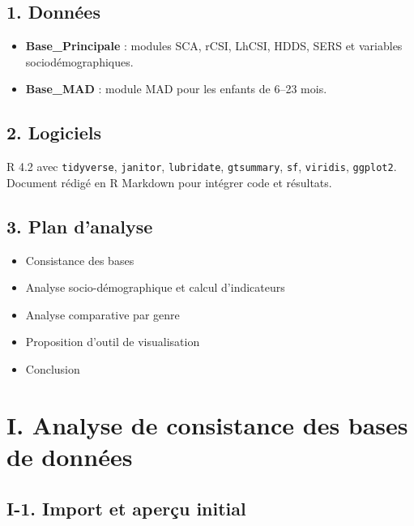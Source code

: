 \documentclass[
]{article}
\providecommand{\tightlist}{%
  \setlength{\itemsep}{0pt}\setlength{\parskip}{0pt}}
\begin{document}
\hypertarget{donnuxe9es}{%
\subsection{1. Données}\label{donnuxe9es}}

\begin{itemize}
\tightlist
\item
  \textbf{Base\_Principale} : modules SCA, rCSI, LhCSI, HDDS, SERS et
  variables sociodémographiques.
\item
  \textbf{Base\_MAD} : module MAD pour les enfants de 6--23 mois.
\end{itemize}

\hypertarget{logiciels}{%
\subsection{2. Logiciels}\label{logiciels}}

R 4.2 avec \texttt{tidyverse}, \texttt{janitor}, \texttt{lubridate},
\texttt{gtsummary}, \texttt{sf}, \texttt{viridis}, \texttt{ggplot2}.
Document rédigé en R Markdown pour intégrer code et résultats.

\hypertarget{plan-danalyse}{%
\subsection{3. Plan d'analyse}\label{plan-danalyse}}

\begin{itemize}
\tightlist
\item
  Consistance des bases
\item
  Analyse socio-démographique et calcul d'indicateurs
\item
  Analyse comparative par genre
\item
  Proposition d'outil de visualisation
\item
  Conclusion
\end{itemize}

\newpage

\hypertarget{i.-analyse-de-consistance-des-bases-de-donnuxe9es}{%
\section{I. Analyse de consistance des bases de
données}\label{i.-analyse-de-consistance-des-bases-de-donnuxe9es}}

\hypertarget{i-1.-import-et-aperuxe7u-initial}{%
\subsection{I-1. Import et aperçu
initial}\label{i-1.-import-et-aperuxe7u-initial}}
\end{document}
